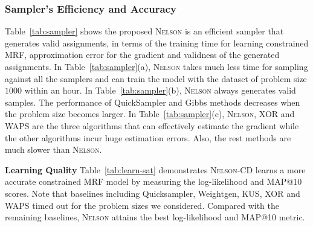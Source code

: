 \documentclass[letterpaper]{article} %
\newcommand{\nls}{\textsc{Nelson}\xspace}
\begin{document}
\subsubsection{Sampler's Efficiency and Accuracy}  Table~\ref{tab:sampler} shows the proposed \nls is an efficient sampler  that generates valid assignments, in terms of the training time for learning constrained MRF, approximation error for the gradient and  validness of the generated  assignments. In Table~\ref{tab:sampler}(a), \nls takes much less time for sampling against all the samplers and can train the model with the dataset of problem size $1000$ within an hour. In Table~\ref{tab:sampler}(b), \nls always generates valid samples. {The performance of} QuickSampler and Gibbs methods decreases when the problem size becomes larger.  In Table~\ref{tab:sampler}(c), \nls, XOR and WAPS are the three algorithms that can effectively estimate the gradient while the other algorithms incur huge estimation errors. Also, the rest methods are much slower than \nls. %





\noindent\textbf{Learning Quality}  Table~\ref{tab:learn-sat} demonstrates \nls-CD learns a more accurate  constrained MRF model by measuring the log-likelihood and MAP@10 scores. Note that baselines including Quicksampler, Weightgen, KUS, XOR and WAPS  timed out for the problem sizes we considered. Compared with the remaining baselines,  \nls attains the best log-likelihood and MAP@10 metric.
\end{document}
